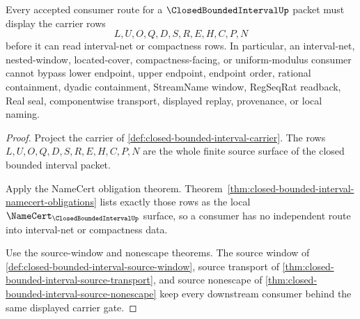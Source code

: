 \begin{theorem}
\label{thm:closedboundedinterval-carrier-gate}
Every accepted consumer route for a $\ClosedBoundedIntervalUp$ packet must display the carrier rows
$$
L,U,O,Q,D,S,R,E,H,C,P,N
$$
before it can read interval-net or compactness rows. In particular, an interval-net, nested-window, located-cover, compactness-facing, or uniform-modulus consumer cannot bypass lower endpoint, upper endpoint, endpoint order, rational containment, dyadic containment, StreamName window, RegSeqRat readback, Real seal, componentwise transport, displayed replay, provenance, or local naming.
\end{theorem}
\begin{proof}
Project the carrier of \autoref{def:closed-bounded-interval-carrier}. The rows $L,U,O,Q,D,S,R,E,H,C,P,N$ are the whole finite source surface of the closed bounded interval packet.

Apply the NameCert obligation theorem. Theorem~\ref{thm:closed-bounded-interval-namecert-obligations} lists exactly those rows as the local $\NameCert_{\ClosedBoundedIntervalUp}$ surface, so a consumer has no independent route into interval-net or compactness data.

Use the source-window and nonescape theorems. The source window of \autoref{def:closed-bounded-interval-source-window}, source transport of \autoref{thm:closed-bounded-interval-source-transport}, and source nonescape of \autoref{thm:closed-bounded-interval-source-nonescape} keep every downstream consumer behind the same displayed carrier gate.
\end{proof}


